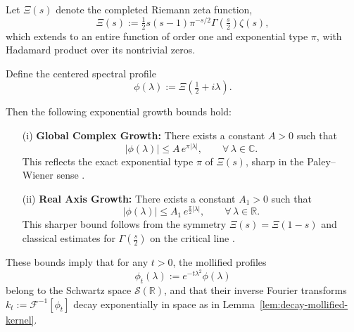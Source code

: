 \begin{lemma}
\label{lem:xi-growth-bound}
Let \( \Xi(s) \) denote the completed Riemann zeta function,
\[
\Xi(s) := \tfrac{1}{2} s(s-1) \pi^{-s/2} \Gamma\left(\tfrac{s}{2}\right) \zeta(s),
\]
which extends to an entire function of order one and exponential type \( \pi \), with Hadamard product over its nontrivial zeros.

Define the centered spectral profile
\[
\phi(\lambda) := \Xi\left( \tfrac{1}{2} + i\lambda \right).
\]

Then the following exponential growth bounds hold:
\begin{itemize}
    \item[\textup{(i)}] \textbf{Global Complex Growth:} There exists a constant \( A > 0 \) such that
    \[
    |\phi(\lambda)| \le A\, e^{\pi |\lambda|}, \qquad \forall\, \lambda \in \mathbb{C}.
    \]
    This reflects the exact exponential type \( \pi \) of \( \Xi(s) \), sharp in the Paley–Wiener sense \cite[Thm.~3.7.1]{Levin1996EntireLectures}.

    \item[\textup{(ii)}] \textbf{Real Axis Growth:} There exists a constant \( A_1 > 0 \) such that
    \[
    |\phi(\lambda)| \le A_1\, e^{\tfrac{\pi}{2} |\lambda|}, \qquad \forall\, \lambda \in \mathbb{R}.
    \]
    This sharper bound follows from the symmetry \( \Xi(s) = \Xi(1 - s) \) and classical estimates for \( \Gamma(\tfrac{s}{2}) \) on the critical line \cite[§4.12]{Titchmarsh1986Zeta}.
\end{itemize}

\noindent
These bounds imply that for any \( t > 0 \), the mollified profiles
\[
\phi_t(\lambda) := e^{-t\lambda^2} \phi(\lambda)
\]
belong to the Schwartz space \( \mathcal{S}(\mathbb{R}) \), and that their inverse Fourier transforms \( k_t := \mathscr{F}^{-1}[\phi_t] \) decay exponentially in space as in Lemma~\ref{lem:decay-mollified-kernel}.
\end{lemma}
